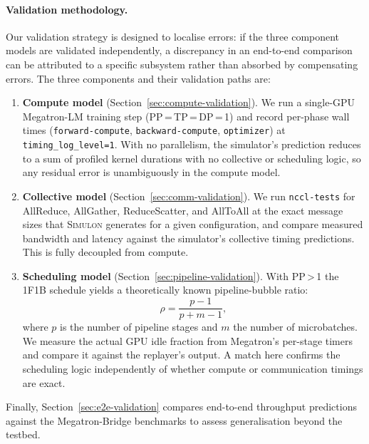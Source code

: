 \paragraph{Validation methodology.}
Our validation strategy is designed to localise errors: if the three
component models are validated independently, a discrepancy in an
end-to-end comparison can be attributed to a specific subsystem rather
than absorbed by compensating errors. The three components and their
validation paths are:

\begin{enumerate}
  \item \textbf{Compute model} (Section~\ref{sec:compute-validation}).
        We run a single-GPU Megatron-LM training step (PP\,=\,TP\,=\,DP\,=\,1)
        and record per-phase wall times (\texttt{forward-compute},
        \texttt{backward-compute}, \texttt{optimizer}) at
        \texttt{timing\_log\_level=1}. With no parallelism, the
        simulator's prediction reduces to a sum of profiled kernel
        durations with no collective or scheduling logic, so any
        residual error is unambiguously in the compute model.

  \item \textbf{Collective model} (Section~\ref{sec:comm-validation}).
        We run \texttt{nccl-tests} for AllReduce, AllGather,
        ReduceScatter, and AllToAll at the exact message sizes that
        \textsc{Simulon} generates for a given configuration, and
        compare measured bandwidth and latency against the simulator's
        collective timing predictions. This is fully decoupled from
        compute.

  \item \textbf{Scheduling model} (Section~\ref{sec:pipeline-validation}).
        With PP\,>\,1 the 1F1B schedule yields a theoretically known
        pipeline-bubble ratio:
        \[
          \rho = \frac{p - 1}{p + m - 1},
        \]
        where $p$ is the number of pipeline stages and $m$ the
        number of microbatches. We measure the actual GPU idle fraction
        from Megatron's per-stage timers and compare it against the
        replayer's output. A match here confirms the scheduling logic
        independently of whether compute or communication timings are
        exact.
\end{enumerate}

Finally, Section~\ref{sec:e2e-validation} compares end-to-end
throughput predictions against the Megatron-Bridge benchmarks to
assess generalisation beyond the testbed.
